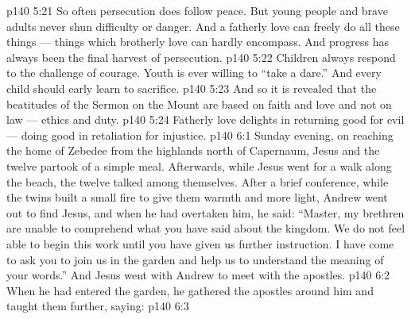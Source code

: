 \vs p140 5:21 So often persecution does follow peace. But young people and brave adults never shun difficulty or danger.  And a fatherly love can freely do all these things --- things which brotherly love can hardly encompass. And progress has always been the final harvest of persecution.
\vs p140 5:22 Children always respond to the challenge of courage. Youth is ever willing to “take a dare.” And every child should early learn to sacrifice.
\vs p140 5:23 \pc And so it is revealed that the beatitudes of the Sermon on the Mount are based on faith and love and not on law --- ethics and duty.
\vs p140 5:24 \pc Fatherly love delights in returning good for evil --- doing good in retaliation for injustice.
\vs p140 6:1 Sunday evening, on reaching the home of Zebedee from the highlands north of Capernaum, Jesus and the twelve partook of a simple meal. Afterwards, while Jesus went for a walk along the beach, the twelve talked among themselves. After a brief conference, while the twins built a small fire to give them warmth and more light, Andrew went out to find Jesus, and when he had overtaken him, he said: “Master, my brethren are unable to comprehend what you have said about the kingdom. We do not feel able to begin this work until you have given us further instruction. I have come to ask you to join us in the garden and help us to understand the meaning of your words.” And Jesus went with Andrew to meet with the apostles.
\vs p140 6:2 When he had entered the garden, he gathered the apostles around him and taught them further, saying: 
\vs p140 6:3 
